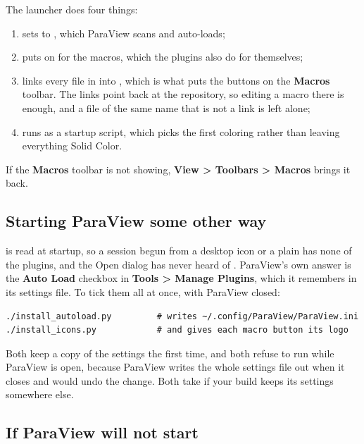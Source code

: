 \documentclass[11pt,a4paper]{article}
\newcommand{\menu}[1]{\textbf{#1}}          %
\begin{document}
The launcher does four things:

\begin{enumerate}[leftmargin=8mm]
  \item sets  to , which ParaView scans and
    auto-loads;
  \item puts  on  for the macros, which the
    plugins also do for themselves;
  \item links every file in  into
    , which is what puts the buttons on the
    \menu{Macros} toolbar. The links point back at the repository, so editing a
    macro there is enough, and a file of the same name that is not a link is
    left alone;
  \item runs  as a startup script, which picks the
    first coloring rather than leaving everything Solid Color.
\end{enumerate}

If the \menu{Macros} toolbar is not showing, \menu{View > Toolbars > Macros}
brings it back.

\subsection{Starting ParaView some other way}

 is read at startup, so a session begun from a desktop icon
or a plain  has none of the plugins, and the Open dialog has
never heard of . ParaView's own answer is the \menu{Auto Load}
checkbox in \menu{Tools > Manage Plugins}, which it remembers in its settings
file. To tick them all at once, with ParaView closed:

\begin{lstlisting}[style=sh]
./install_autoload.py         # writes ~/.config/ParaView/ParaView.ini
./install_icons.py            # and gives each macro button its logo
\end{lstlisting}

Both keep a copy of the settings the first time, and both refuse to run while
ParaView is open, because ParaView writes the whole settings file out when it
closes and would undo the change. Both take  if your build
keeps its settings somewhere else.

\subsection{If ParaView will not start}
\end{document}
